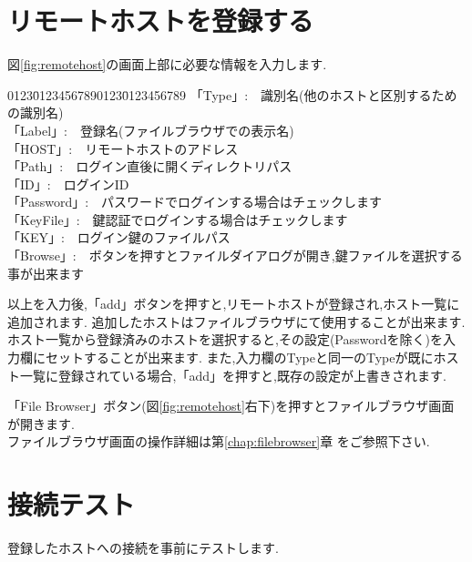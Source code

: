 \documentclass[a4paper,10pt,oneside]{jsbook}
\begin{document}
\newpage 

\section{リモートホストを登録する}
図\ref{fig:remotehost}の画面上部に必要な情報を入力します.
\begin{tabbing}
0123\=01234567890123\=0123456789\kill
\>「Type」\>:\ \ 識別名(他のホストと区別するための識別名)\\
\>「Label」\>:\ \ 登録名(ファイルブラウザでの表示名)\\
\>「HOST」\>:\ \ リモートホストのアドレス\\
\>「Path」\>:\ \ ログイン直後に開くディレクトリパス\\
\>「ID」\>:\ \ ログインID\\
\>「Password」\>:\ \ パスワードでログインする場合はチェックします\\
\>「KeyFile」\>:\ \ 鍵認証でログインする場合はチェックします\\
\>「KEY」\>:\ \ ログイン鍵のファイルパス\\
\>「Browse」\>:\ \ ボタンを押すとファイルダイアログが開き,鍵ファイルを選択する事が出来ます
\end{tabbing}

以上を入力後,「add」ボタンを押すと,リモートホストが登録され,ホスト一覧に追加されます.
追加したホストはファイルブラウザにて使用することが出来ます.
ホスト一覧から登録済みのホストを選択すると,その設定(Passwordを除く)を入力欄にセットすることが出来ます.
また,入力欄のTypeと同一のTypeが既にホスト一覧に登録されている場合,「add」を押すと,既存の設定が上書きされます.

「File Browser」ボタン(図\ref{fig:remotehost}右下)を押すとファイルブラウザ画面が開きます. \\
ファイルブラウザ画面の操作詳細は第\ref{chap:filebrowser}章 をご参照下さい.

\newpage
\section{接続テスト}
登録したホストへの接続を事前にテストします.
\end{document}
